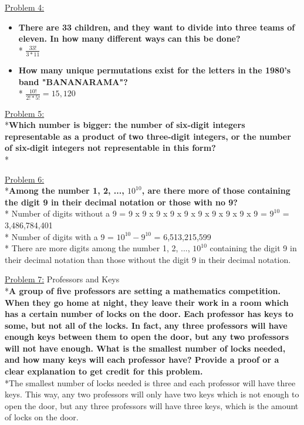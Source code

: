 \documentclass[12pt]{article}
\begin{document}
\noindent
\uline{Problem 4:}
\begin{itemize}
\item\textbf{There are 33 children, and they want to divide into three teams of eleven. In how many different ways can this be done?}
\\* $\frac{33!}{3 * 11}$
\item\textbf{How many unique permutations exist for the letters in the 1980's band "BANANARAMA"?}
\\* $\frac{10!}{2! * 5!} = 15,120$
\end{itemize}
\bigskip

\noindent
\uline{Problem 5:}
\\*\textbf{Which number is bigger: the number of six-digit integers representable as a product of two three-digit integers, or the number of six-digit integers not representable in this form?}
\\* 
\bigskip

\noindent
\uline{Problem 6:}
\\*\textbf{Among the number 1, 2, ..., $10^{10}$, are there more of those containing the digit 9 in their decimal notation or those with no 9?}
\medskip
\\* Number of digits without a 9 = 9 x 9 x 9 x 9 x 9 x 9 x 9 x 9 x 9 x 9 = $9^{10}$ = 3,486,784,401
\\* Number of digits with a 9 = $10^{10} - 9^{10}$ = 6,513,215,599
\\* There are more digits among the number 1, 2, ..., $10^{10}$ containing the digit 9 in their decimal notation than those without the digit 9 in their decimal notation.
\bigskip

\noindent
\uline{Problem 7:} Professors and Keys
\\*\textbf{A group of five professors are setting a mathematics competition. When they go home at night, they leave
their work in a room which has a certain number of locks on the door. Each professor has keys to some, but
not all of the locks. In fact, any three professors will have enough keys between them to open the door, but
any two professors will not have enough. What is the smallest number of locks needed, and how many keys
will each professor have? Provide a proof or a clear explanation to get credit for this problem.}
\medskip
\\*The smallest number of locks needed is three and each professor will have three keys. This way, any two professors will only have two keys which is not enough to open the door, but any three professors will have three keys, which is the amount of locks on the door.
\end{document}
